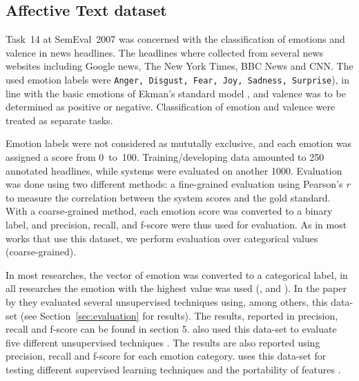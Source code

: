 \documentclass[11pt]{article}
\begin{document}
\subsection{Affective Text dataset}
\label{sec:data:affect}
Task~14 at SemEval~2007  \cite{strapparava2007semeval} was concerned with the classification of emotions and valence in news headlines. The headlines where collected from several news websites including Google news,  The New York Times, BBC News and CNN. The used emotion labels were \texttt{Anger, Disgust, Fear, Joy, Sadness, Surprise}), in line with the basic emotions of Ekman's standard model \cite{ekman1992argument},
 and valence was to be determined as positive or negative. Classification of emotion and valence were treated as separate tasks. 

Emotion labels were not considered as mututally exclusive, and each emotion was assigned a score from 0~to~100. Training/developing data amounted to 250 annotated headlines, while systems were evaluated on another 1000. Evaluation was done using two different methods: a fine-grained evaluation using Pearson's \textit{r}  to measure the correlation between the system scores and the gold standard. With a coarse-grained method, each emotion score was converted to a binary label, and precision, recall, and f-score were thus used for evaluation. As in most works that use this dataset, we perform evaluation over categorical values (coarse-grained).


In most researches, the vector of emotion was converted to a categorical label, in all researches the emotion with the highest value was used (\cite{chaffar2011using}, \cite{calvo2013emotions} and \cite{kim2010evaluation}).
In the paper by \cite{kim2010evaluation} they evaluated several unsupervised techniques using, among others, this data-set (see Section~\ref{sec:evaluation} for results). The results, reported in precision, recall and f-score can be found in section 5.  also used this data-set to evaluate five different unsupervised techniques . The results are also reported using precision, recall and f-score for each emotion category.  uses this data-set for testing different supervised learning techniques and the portability of features \cite{mohammad:2012:NAACL-HLT}.

%
\end{document}
